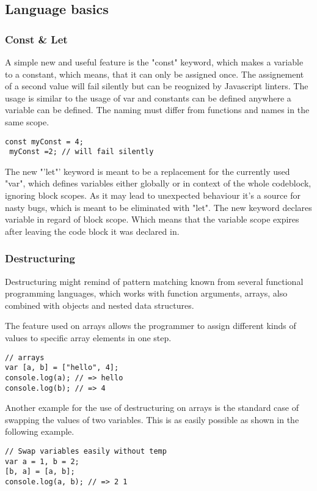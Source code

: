 \documentclass{bioinfo}
\begin{document}
\subsection{Language basics}

\subsubsection{Const \& Let}
A simple new and useful feature is the "const" keyword, which makes a variable to a constant, which means, 
that it can only be assigned once. The assignement of a second value will fail silently but can be reognized by
Javascript linters. The usage is similar to the usage of var and constants can be defined anywhere a variable can be defined.
The naming must differ from functions and names in the same scope. 
\begin{lstlisting}[caption= My Javascript Example]
const myConst = 4;
 myConst =2; // will fail silently
\end{lstlisting}

The new "'let"' keyword is meant to be a replacement for the currently used "var", which defines variables 
either globally or in context of the whole codeblock, ignoring block scopes. As it may lead to unexpected behaviour
it's a source for nasty bugs, which is meant to be eliminated with "let". The new keyword declares variable in 
regard of block scope. Which means that the variable scope expires after leaving the code block it was declared in.


\subsubsection{Destructuring}
Destructuring might remind of pattern matching known from several functional programming languages, which works with function arguments,
arrays, also combined with objects and nested data structures.

The feature used on arrays allows the programmer to assign different kinds of values to specific array elements in one step.
\begin{lstlisting}[caption= My Javascript Example]
// arrays
var [a, b] = ["hello", 4];
console.log(a); // => hello
console.log(b); // => 4
\end{lstlisting}

Another example for the use of destructuring on arrays is the standard case of swapping the values of two variables.
This is as easily possible as shown in the following example.
\begin{lstlisting}[caption= My Javascript Example]
// Swap variables easily without temp
var a = 1, b = 2;
[b, a] = [a, b];
console.log(a, b); // => 2 1
\end{lstlisting}
\end{document}
